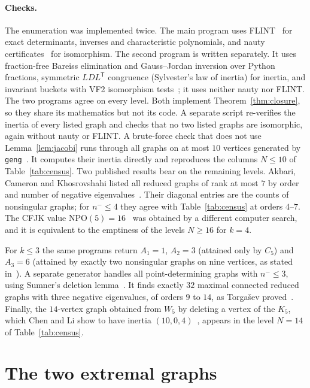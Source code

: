 \documentclass[11pt]{amsart}
\theoremstyle{definition}
\theoremstyle{remark}
\begin{document}
\paragraph{Checks.} The enumeration was implemented twice. The main program uses FLINT~\cite{FLINT} for exact determinants, inverses and characteristic polynomials, and nauty certificates~\cite{McKayPiperno2014} for isomorphism. The second program is written separately. It uses fraction-free Bareiss elimination and Gauss--Jordan inversion over Python fractions, symmetric $LDL^{\mathsf T}$ congruence (Sylvester's law of inertia) for inertia, and invariant buckets with VF2 isomorphism tests~\cite{networkx}; it uses neither nauty nor FLINT. The two programs agree on every level. Both implement Theorem~\ref{thm:closure}, so they share its mathematics but not its code. A separate script re-verifies the inertia of every listed graph and checks that no two listed graphs are isomorphic, again without nauty or FLINT. A brute-force check that does not use Lemma~\ref{lem:jacobi} runs through all graphs on at most $10$ vertices generated by \texttt{geng}~\cite{McKayPiperno2014}. It computes their inertia directly and reproduces the columns $N\le10$ of Table~\ref{tab:census}. Two published results bear on the remaining levels. Akbari, Cameron and Khosrovshahi listed all reduced graphs of rank at most $7$ by order and number of negative eigenvalues~\cite[Table~2]{ACK2004}. Their diagonal entries are the counts of nonsingular graphs; for $n^-\le4$ they agree with Table~\ref{tab:census} at orders $4$--$7$. The CFJK value $\mathrm{NPO}(5)=16$~\cite{CFJK2013} was obtained by a different computer search, and it is equivalent to the emptiness of the levels $N\ge16$ for $k=4$.

For $k\le3$ the same programs return $A_1=1$, $A_2=3$ (attained only by $C_5$) and $A_3=6$ (attained by exactly two nonsingular graphs on nine vertices, as stated in~\cite{AEKPT2026}). A separate generator handles all point-determining graphs with $n^-\le3$, using Sumner's deletion lemma~\cite{Sumner1973}. It finds exactly $32$ maximal connected reduced graphs with three negative eigenvalues, of orders $9$ to $14$, as Torga\v{s}ev proved~\cite{Torgasev1989}. Finally, the $14$-vertex graph obtained from $W_5$ by deleting a vertex of the $K_5$, which Chen and Li show to have inertia $(10,0,4)$~\cite{ChenLi2026}, appears in the level $N=14$ of Table~\ref{tab:census}.

\section{The two extremal graphs}\label{sec:extremal}
\end{document}
